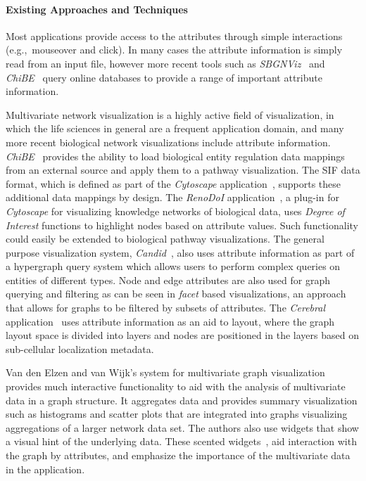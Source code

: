 \documentclass[twocolumn]{bmcart}%
\begin{document}
\paragraph*{Existing Approaches and Techniques}

Most applications provide access to the attributes through simple interactions (e.g.,~mouseover and click).
In many cases the attribute information is simply read from an input file, however more recent tools such as \textit{SBGNViz}~\cite{SBGNViz2015} and \textit{ChiBE}~\cite{Babur2010chibe} query online databases to provide a range of important attribute information.

Multivariate network visualization is a highly active field of visualization, in which the life sciences in general are a frequent application domain, and many more recent biological network visualizations include attribute information.
\textit{ChiBE}~\cite{Babur2010chibe} provides the ability to load biological entity regulation data mappings from an external source and apply them to a pathway visualization.
The SIF data format, which is defined as part of the \textit{Cytoscape} application~\cite{Shannon2003cytoscape}, supports these additional data mappings by design.
The \textit{RenoDoI} application~\cite{Vehlow2015}, a plug-in for \textit{Cytoscape} for visualizing knowledge networks of biological data, uses \emph{Degree of Interest} functions to highlight nodes based on attribute values.
Such functionality could easily be extended to biological pathway visualizations.
The general purpose visualization system, \textit{Candid}~\cite{Shadoan2013}, also uses attribute information as part of a hypergraph query system which allows users to perform complex queries on entities of different types.
Node and edge attributes are also used for graph querying and filtering as can be seen in \textit{facet} based visualizations, an approach that allows for graphs to be filtered by subsets of attributes.
The \textit{Cerebral} application~\cite{Barsky2008cerebral} uses attribute information as an aid to layout, where the graph layout space is divided into layers and nodes are positioned in the layers based on sub-cellular localization metadata.


Van den Elzen and van Wijk’s \cite{van2014multivariate} system for multivariate graph visualization provides much interactive functionality to aid with the analysis of multivariate data in a graph structure. It aggregates data and provides summary visualization such as histograms and scatter plots that are integrated into graphs visualizing aggregations of a larger network data set. The authors also use widgets that show a visual hint of the underlying data. These scented widgets~\cite{willett2007scented}, aid interaction with the graph by attributes, and emphasize  the importance of the multivariate data in the application.
\end{document}
